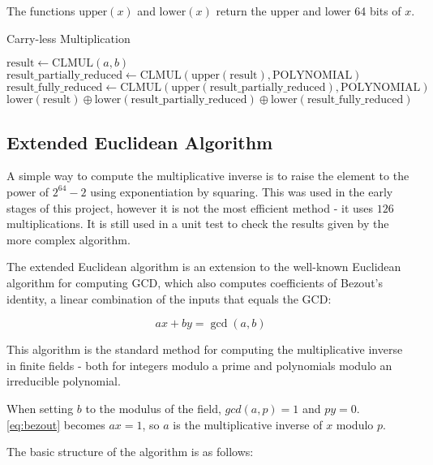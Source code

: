 The functions $\text{upper}(x)$ and $\text{lower}(x)$ return the upper and lower 64 bits of $x$.

\begin{algorithm}
\caption{Carry-less Multiplication}
\begin{algorithmic}
\State $\text{result} \gets \text{CLMUL}(a, b)$
\State $\text{result\_partially\_reduced} \gets \text{CLMUL}(\text{upper}(\text{result}), \text{POLYNOMIAL})$
\State $\text{result\_fully\_reduced} \gets \text{CLMUL}(\text{upper}(\text{result\_partially\_reduced}), \text{POLYNOMIAL})$
\State \Return $\text{lower}(\text{result}) \oplus \text{lower}(\text{result\_partially\_reduced}) \oplus \text{lower}(\text{result\_fully\_reduced})$
\EndFunction
\end{algorithmic}
\end{algorithm}

\subsection{Extended Euclidean Algorithm}

A simple way to compute the multiplicative inverse is to raise the element to the power of $2^{64} - 2$ using exponentiation by squaring.
This was used in the early stages of this project, however it is not the most efficient method - it uses $126$ multiplications.
It is still used in a unit test to check the results given by the more complex algorithm.

The extended Euclidean algorithm is an extension to the well-known Euclidean algorithm for computing GCD, which also computes coefficients of Bezout's identity, a linear combination of the inputs that equals the GCD:

\begin{equation}
ax + by = \gcd(a, b) \label{eq:bezout}
\end{equation}

This algorithm is the standard method for computing the multiplicative inverse in finite fields - both for integers modulo a prime and polynomials modulo an irreducible polynomial.

When setting $b$ to the modulus of the field, $gcd(a, p) = 1$ and $py = 0$. \ref{eq:bezout} becomes $ax = 1$, so $a$ is the multiplicative inverse of $x$ modulo $p$.

The basic structure of the algorithm is as follows:

